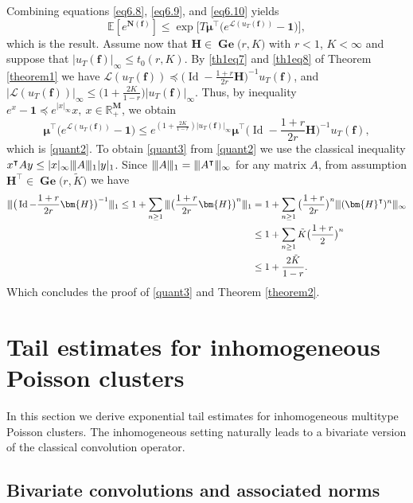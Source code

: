 \documentclass[reqno,final,11pt]{amsart}
\theoremstyle{plain}
\theoremstyle{definition}
\theoremstyle{remark}
\newcommand{\R}{\mathds{R}}
\newcommand{\E}[1]{\mathds{E}\left[#1\right]}
\newcommand{\M}{\bm{M}}
\newcommand{\Ge}[2]{\bm{\Gel(} #1,#2 \bm{)} }
\renewcommand{\L}{\bm{\mathscr{L}}}
\newcommand{\ones}{\bm{1}}
\renewcommand{\H}{\bm{H}}
\newcommand{\pos}{\R_+^{\M}}
\newcommand{\Vvert}{\vert \hspace{-1pt} \vert \hspace{-1pt} \vert}
\newcommand{\trp}{^{\intercal}}
\DeclareMathOperator{\Gel}{Ge}
\DeclareMathOperator{\Id}{Id}
\begin{document}
Combining equations \eqref{eq6.8}, \eqref{eq6.9}, and \eqref{eq6.10} yields
\begin{equation*}
	\E{e^{\bm{N}(\bm{f})}} \leq \exp\Big[ T \bm{\mu}\trp \big(e^{\L(u_T(\bm{f}))}-\ones\big)\Big],
\end{equation*}
which is the result. Assume now that $\H \in\Ge{r}{K}$ with $r<1$, $K<\infty$ and suppose that $\vert u_T(\bm{f}) \vert_{\infty} \leq t_0(r,K)$. By \eqref{th1eq7} and \eqref{th1eq8} of Theorem \ref{theorem1} we have $\L(u_T(\bm{f})) \preceq \big( \Id-\frac{1+r}{2r}\H\big)^{-1}u_T(\bm{f})$, and $\vert\L(u_T(\bm{f}))\vert_{\infty} \leq \big(1+\frac{2K}{1-r}\big) \vert u_T(\bm{f})\vert_{\infty}$. Thus, by inequality $e^x-\ones \preceq e^{\vert x\vert_{\infty}} x, \ x\in\pos$, we obtain 
\begin{equation*}
	\bm{\mu}\trp \big(e^{\L(u_T(\bm{f}))}-\ones\big) \leq e^{(1+\frac{2K}{1-r}) \vert u_T(\bm{f})\vert_{\infty}} \bm{\mu}\trp \big(\Id-\frac{1+r}{2r}\H\big)^{-1} u_T(\bm{f}),
\end{equation*}
which is \eqref{quant2}. To obtain \eqref{quant3} from \eqref{quant2} we use the classical inequality $x\trp A y \leq \vert x\vert_\infty \Vvert A\Vvert_1 \vert y\vert_1$. Since $\Vvert A\Vvert_1 = \Vvert A\trp\Vvert_{\infty}$ for any matrix $A$, from assumption $\H\trp \in\Ge{r}{\tilde{K}}$ we have
\begin{align*}
	\Vvert \big(\Id-\frac{1+r}{2r}\H\big)^{-1} \Vvert_1  \leq 1 + \sum_{n\geq 1} \Vvert \big(\frac{1+r}{2r} \H\big)^n \Vvert_1 & = 1 + \sum_{n\geq 1} \big(\frac{1+r}{2r}\big)^n \Vvert  (\H^{\intercal})^n \Vvert_{\infty} \\
	& \leq 1 + \sum_{n\geq 1} \tilde{K} \big(\frac{1+r}{2}\big)^n\\
	& \leq  1 + \frac{2\tilde{K}}{1-r}.
\end{align*}
Which concludes the proof of \eqref{quant3} and Theorem \ref{theorem2}.

\section{Tail estimates for inhomogeneous Poisson clusters}\label{section4}

In this section we derive exponential tail estimates for inhomogeneous multitype Poisson clusters. The inhomogeneous setting naturally leads to a bivariate version of the classical convolution operator. 

\subsection{Bivariate convolutions and associated norms}\label{sec4.1}
\end{document}
